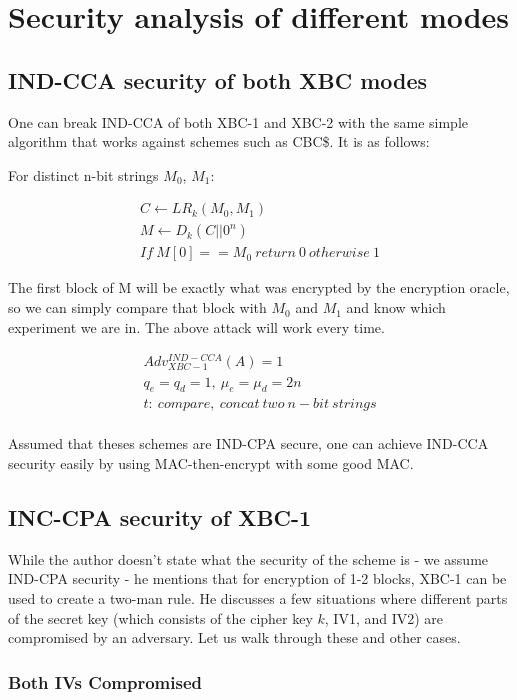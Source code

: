 \documentclass[conference]{IEEEtran}
\begin{document}
\section{Security analysis of different modes}

\subsection{IND-CCA security of both XBC modes}
One can break IND-CCA of both XBC-1 and XBC-2 with the same simple algorithm that works against schemes such as CBC\$. It is as follows:

For distinct n-bit strings $M_0$, $M_1$:

\begin{gather*}
  C \leftarrow LR_k (M_0, M_1) \\
  M \leftarrow D_k (C || 0^n) \\
  If\ M[0] == M_0\ return\ 0\ otherwise\ 1
\end{gather*}

The first block of M will be exactly what was encrypted by the encryption oracle, so we can simply compare that block with $M_0$ and $M_1$ and know which experiment we are in. The above attack will work every time.

\begin{gather*}
  Adv_{XBC-1}^{IND-CCA}(A) = 1 \\
  q_e=q_d=1,\ \mu_e = \mu_d = 2n \\
  t:\ compare,\ concat\ two\ n-bit\ strings \\
\end{gather*}

Assumed that theses schemes are IND-CPA secure, one can achieve IND-CCA security easily by using MAC-then-encrypt with some good MAC.

\subsection{INC-CPA security of XBC-1}

While the author doesn't state what the security of the scheme is  - we assume IND-CPA security - he mentions that for encryption of 1-2 blocks, XBC-1 can be used to create a two-man rule. He discusses a few situations where different parts of the secret key (which consists of the cipher key $k$, IV1, and IV2) are compromised by an adversary. Let us walk through these and other cases. \\

\subsubsection{Both IVs Compromised} \
\end{document}
